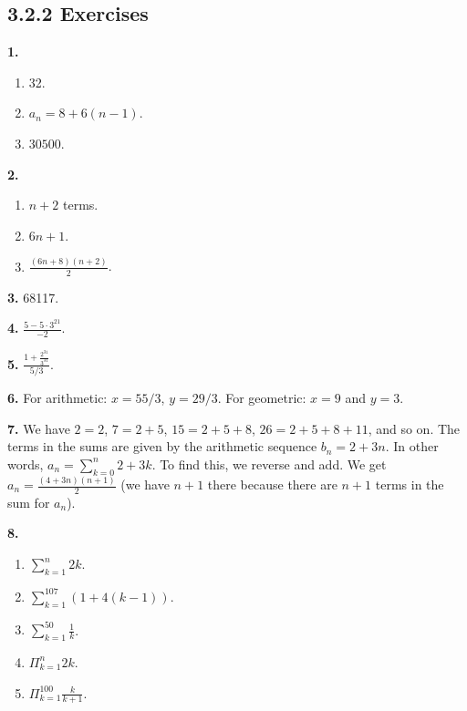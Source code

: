 \documentclass[10pt,]{book}
\theoremstyle{plain}
\theoremstyle{definition}
\theoremstyle{definition}
\theoremstyle{definition}
\numberwithin{equation}{chapter}
\def\d{\displaystyle}
\def\prod{\Pi}
\begin{document}
\subsection*{3.2.2 Exercises}
\noindent\textbf{1.}\quad{}\leavevmode%
\begin{enumerate}[label=(\alph*)]
\item\hypertarget{li-894}{}
                  32.
\item\hypertarget{li-895}{}\(a_n = 8 + 6(n-1)\).%
\item\hypertarget{li-896}{}\(30500\).%
\end{enumerate}
\par\smallskip
\noindent\textbf{2.}\quad{}\leavevmode%
\begin{enumerate}[label=(\alph*)]
\item\hypertarget{li-900}{}\(n+2\) terms.%
\item\hypertarget{li-901}{}\(6n+1\).%
\item\hypertarget{li-902}{}\(\frac{(6n+8)(n+2)}{2}\).%
\end{enumerate}
\par\smallskip
\noindent\textbf{3.}\quad{}
              68117.
\par\smallskip
\noindent\textbf{4.}\quad{}
              \(\frac{5-5\cdot 3^{21}}{-2}\).
\par\smallskip
\noindent\textbf{5.}\quad{}
              \(\frac{1 + \frac{2^{31}}{3^{31}}}{5/3}\).
\par\smallskip
\noindent\textbf{6.}\quad{}
              For arithmetic: \(x = 55/3\), \(y = 29/3\). For geometric: \(x = 9\) and \(y = 3\).
\par\smallskip
\noindent\textbf{7.}\quad{}
              We have \(2 = 2\), \(7 = 2+5\), \(15 = 2 + 5 + 8\), \(26 = 2+5+8+11\), and so on. The terms in the sums are given by the arithmetic sequence \(b_n = 2+3n\). In other words, \(a_n = \sum_{k=0}^n 2+3k\). To find this, we reverse and add. We get \(a_n = \frac{(4+3n)(n+1)}{2}\) (we have \(n+1\) there because there are \(n+1\) terms in the sum for \(a_n\)).
\par\smallskip
\noindent\textbf{8.}\quad{}\leavevmode%
\begin{enumerate}[label=(\alph*)]
\item\hypertarget{li-908}{}\(\d\sum_{k=1}^n 2k\).%
\item\hypertarget{li-909}{}\(\d\sum_{k=1}^{107} (1 + 4(k-1))\).%
\item\hypertarget{li-910}{}\(\d\sum_{k=1}^{50} \frac{1}{k}\).%
\item\hypertarget{li-911}{}\(\d\prod_{k=1}^n 2k\).%
\item\hypertarget{li-912}{}\(\d\prod_{k=1}^{100} \frac{k}{k+1}\).%
\end{enumerate}
\end{document}
